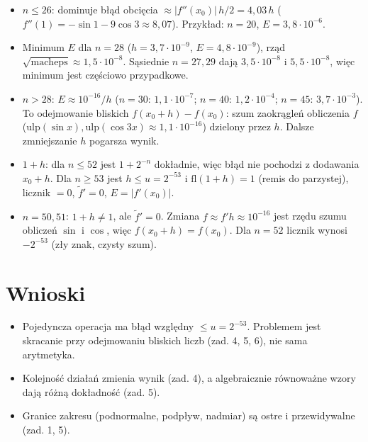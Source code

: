 \documentclass[10pt,a4paper]{article}
\newcommand{\macheps}{\mathrm{macheps}}
\begin{document}
\begin{itemize}
\item $n\le26$: dominuje błąd obcięcia $\approx|f''(x_0)|\,h/2=4{,}03\,h$ ($f''(1)=-\sin1-9\cos3\approx8{,}07$). Przykład: $n=20$, $E=3{,}8\cdot10^{-6}$.
\item Minimum $E$ dla $n=28$ ($h=3{,}7\cdot10^{-9}$, $E=4{,}8\cdot10^{-9}$), rząd $\sqrt{\macheps}\approx1{,}5\cdot10^{-8}$. Sąsiednie $n=27,29$ dają $3{,}5\cdot10^{-8}$ i $5{,}5\cdot10^{-8}$, więc minimum jest częściowo przypadkowe.
\item $n>28$: $E\approx10^{-16}/h$ ($n=30$: $1{,}1\cdot10^{-7}$; $n=40$: $1{,}2\cdot10^{-4}$; $n=45$: $3{,}7\cdot10^{-3}$). To odejmowanie bliskich $f(x_0+h)-f(x_0)$: szum zaokrągleń obliczenia $f$ ($\mathrm{ulp}(\sin x),\mathrm{ulp}(\cos3x)\approx1{,}1\cdot10^{-16}$) dzielony przez $h$. Dalsze zmniejszanie $h$ pogarsza wynik.
\item $1+h$: dla $n\le52$ jest $1+2^{-n}$ dokładnie, więc błąd nie pochodzi z dodawania $x_0+h$. Dla $n\ge53$ jest $h\le u=2^{-53}$ i $\mathrm{fl}(1+h)=1$ (remis do parzystej), licznik $=0$, $\tilde f'=0$, $E=|f'(x_0)|$.
\item $n=50,51$: $1+h\ne1$, ale $\tilde f'=0$. Zmiana $f\approx f'h\approx10^{-16}$ jest rzędu szumu obliczeń $\sin$ i $\cos$, więc $f(x_0+h)=f(x_0)$. Dla $n=52$ licznik wynosi $-2^{-53}$ (zły znak, czysty szum).
\end{itemize}

\section*{Wnioski}
\begin{itemize}
\item Pojedyncza operacja ma błąd względny $\le u=2^{-53}$. Problemem jest skracanie przy odejmowaniu bliskich liczb (zad. 4, 5, 6), nie sama arytmetyka.
\item Kolejność działań zmienia wynik (zad. 4), a algebraicznie równoważne wzory dają różną dokładność (zad. 5).
\item Granice zakresu (podnormalne, podpływ, nadmiar) są ostre i przewidywalne (zad. 1, 5).
\end{itemize}
\end{document}
